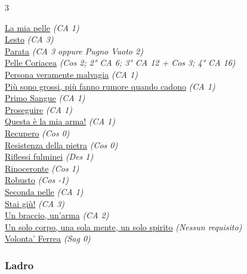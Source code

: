 \begin{multicols}{3}
{\begin{flushleft}
\hyperlink{La mia pelle}{La mia pelle} \textit{(CA 1)}\\
\hyperlink{Lesto}{Lesto} \textit{(CA 3)}\\
\hyperlink{Parata}{Parata} \textit{(CA 3 oppure Pugno Vuoto 2)}\\
\hyperlink{Pelle Coriacea}{Pelle Coriacea} \textit{(Cos 2; 2° CA 6; 3° CA 12 + Cos 3; 4° CA 16)}\\
\hyperlink{Persona veramente malvagia}{Persona veramente malvagia} \textit{(CA 1)}\\
\hyperlink{Più sono grossi, più fanno rumore quando cadono}{Più sono grossi, più fanno rumore quando cadono} \textit{(CA 1)}\\
\hyperlink{Primo Sangue}{Primo Sangue} \textit{(CA 1)}\\
\hyperlink{Proseguire}{Proseguire} \textit{(CA 1)}\\
\hyperlink{Questa è la mia arma!}{Questa è la mia arma!} \textit{(CA 1)}\\
\hyperlink{Recupero}{Recupero} \textit{(Cos 0)}\\
\hyperlink{Resistenza della pietra}{Resistenza della pietra} \textit{(Cos 0)}\\
\hyperlink{Riflessi fulminei}{Riflessi fulminei} \textit{(Des 1)}\\
\hyperlink{Rinoceronte}{Rinoceronte} \textit{(Cos 1)}\\
\hyperlink{Robusto}{Robusto} \textit{(Cos -1)}\\
\hyperlink{Seconda pelle}{Seconda pelle} \textit{(CA 1)}\\
\hyperlink{Stai giù!}{Stai giù!} \textit{(CA 3)}\\
\hyperlink{Un braccio, un'arma}{Un braccio, un'arma} \textit{(CA 2)}\\
\hyperlink{Un solo corpo, una sola mente, un solo spirito}{Un solo corpo, una sola mente, un solo spirito} \textit{(Nessun requisito)}\\
\hyperlink{Volonta' Ferrea}{Volonta' Ferrea} \textit{(Sag 0)}\\

\subsubsection*{Ladro}


\end{flushleft}}
\end{multicols}
